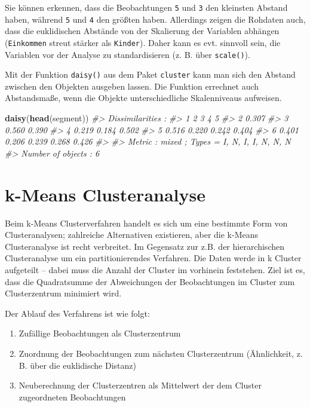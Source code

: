 \documentclass[12pt,ngerman,]{book}
\makeatletter
\newenvironment{Shaded}{\begin{snugshade}}{\end{snugshade}}
\newcommand{\KeywordTok}[1]{\textcolor[rgb]{0.13,0.29,0.53}{\textbf{{#1}}}}
\newcommand{\CommentTok}[1]{\textcolor[rgb]{0.56,0.35,0.01}{\textit{{#1}}}}
\newcommand{\NormalTok}[1]{{#1}}
\providecommand{\tightlist}{%
  \setlength{\itemsep}{0pt}\setlength{\parskip}{0pt}}
\newenvironment{kframe}{%
\medskip{}
\setlength{\fboxsep}{.8em}
 \def\at@end@of@kframe{}%
 \ifinner\ifhmode%
  \def\at@end@of@kframe{\end{minipage}}%
  \begin{minipage}{\columnwidth}%
 \fi\fi%
 \def\FrameCommand##1{\hskip\@totalleftmargin \hskip-\fboxsep
 \colorbox{shadecolor}{##1}\hskip-\fboxsep
     \hskip-\linewidth \hskip-\@totalleftmargin \hskip\columnwidth}%
 \MakeFramed {\advance\hsize-\width
   \@totalleftmargin\z@ \linewidth\hsize
   \@setminipage}}%
 {\par\unskip\endMakeFramed%
 \at@end@of@kframe}
\renewenvironment{Shaded}{\begin{kframe}}{\end{kframe}}
\makeatother
\begin{document}
Sie können erkennen, dass die Beobachtungen \texttt{5} und \texttt{3}
den kleinsten Abstand haben, während \texttt{5} und \texttt{4} den
größten haben. Allerdings zeigen die Rohdaten auch, dass die
euklidischen Abstände von der Skalierung der Variablen abhängen
(\texttt{Einkommen} streut stärker als \texttt{Kinder}). Daher kann es
evt. sinnvoll sein, die Variablen vor der Analyse zu standardisieren (z.
B. über \texttt{scale()}).

Mit der Funktion \texttt{daisy()} aus dem Paket \texttt{cluster} kann
man sich den Abstand zwischen den Objekten ausgeben lassen. Die Funktion
errechnet auch Abstandsmaße, wenn die Objekte unterschiedliche
Skalenniveaus aufweisen.

\begin{Shaded}
\begin{Highlighting}[]
\KeywordTok{daisy}\NormalTok{(}\KeywordTok{head}\NormalTok{(segment))}
\CommentTok{#> Dissimilarities :}
\CommentTok{#>       1     2     3     4     5}
\CommentTok{#> 2 0.307                        }
\CommentTok{#> 3 0.560 0.390                  }
\CommentTok{#> 4 0.219 0.184 0.502            }
\CommentTok{#> 5 0.516 0.220 0.242 0.404      }
\CommentTok{#> 6 0.401 0.206 0.239 0.268 0.426}
\CommentTok{#> }
\CommentTok{#> Metric :  mixed ;  Types = I, N, I, I, N, N, N }
\CommentTok{#> Number of objects : 6}
\end{Highlighting}
\end{Shaded}

\section{k-Means Clusteranalyse}\label{k-means-clusteranalyse}

Beim k-Means Clusterverfahren handelt es sich um eine bestimmte Form von
Clusteranalysen; zahlreiche Alternativen existieren, aber die k-Means
Clusteranalyse ist recht verbreitet. Im Gegensatz zur z.B. der
hierarchischen Clusteranalyse um ein partitionierendes Verfahren. Die
Daten werde in k Cluster aufgeteilt -- dabei muss die Anzahl der Cluster
im vorhinein feststehen. Ziel ist es, dass die Quadratsumme der
Abweichungen der Beobachtungen im Cluster zum Clusterzentrum minimiert
wird.

Der Ablauf des Verfahrens ist wie folgt:

\begin{enumerate}
\def\labelenumi{\arabic{enumi}.}
\tightlist
\item
  Zufällige Beobachtungen als Clusterzentrum
\item
  Zuordnung der Beobachtungen zum nächsten Clusterzentrum (Ähnlichkeit,
  z. B. über die euklidische Distanz)
\item
  Neuberechnung der Clusterzentren als Mittelwert der dem Cluster
  zugeordneten Beobachtungen
\end{enumerate}
\end{document}
